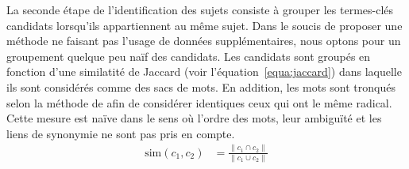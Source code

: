     La seconde étape de l'identification des sujets consiste à grouper les
    termes-clés candidats lorsqu'ils appartiennent au même sujet.
    Dans le soucis de proposer une méthode ne faisant pas l'usage de données
    supplémentaires, nous optons pour un groupement quelque peu naïf des
    candidats. Les candidats sont groupés en fonction d'une similatité de
    Jaccard (voir l'équation~\ref{equa:jaccard}) dans laquelle ils sont
    considérés comme des sacs de mots. En addition, les mots sont tronqués selon
    la méthode de  afin de considérer
    identiques ceux qui ont le même radical. Cette mesure est naïve dans le sens
    où l'ordre des mots, leur ambiguïté et les liens de synonymie ne sont pas
    pris en compte.
    \begin{align}
      \text{sim}(c_1, c_2) &= \frac{\|c_1 \cap c_2\|}{\|c_1 \cup c_2\|} \label{equa:jaccard}
    \end{align}

